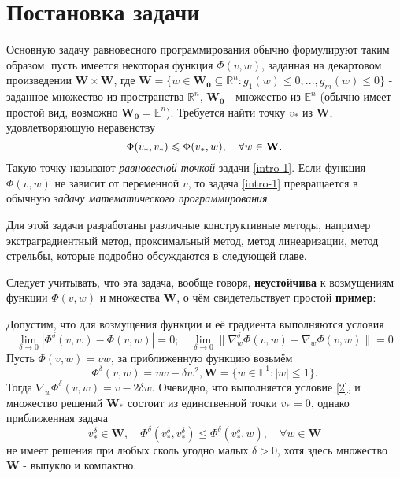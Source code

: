 {}
\section*{Постановка задачи}
	Основную задачу равновесного программирования обычно формулируют таким образом: пусть имеется некоторая функция $\Phi(v,w)$, заданная на декартовом произведении $\mathbf{W}\times \mathbf{W}$, где $\mathbf{W}=\{w\in \mathbf{W_0}\subseteq\mathbb{R}^n:g_1(w)\leqslant 0,...,g_m(w)\leqslant 0 \}$ - заданное множество из пространства $\mathbb{R}^n$, $\mathbf{W_0}$ - множество из $\mathbb{E}^n$ (обычно имеет простой вид, возможно $\mathbf{W_{0}}=\mathbb{E}^n$). Требуется найти точку $v_*$ из $\mathbf{W}$, удовлетворяющую неравенству 
	\begin{equation}
	\centering
	\label{intro-1}
	\Phi(v_*,v_*)\leqslant\Phi(v_*,w),\quad \forall w\in \mathbf{W}.
	\end{equation}
	Такую точку называют \emph{равновесной точкой} задачи \eqref{intro-1}. Если функция $\Phi(v,w)$ не зависит от переменной $v$, то задача \eqref{intro-1} превращается в обычную \textit{задачу математического программирования}.
	
	Для этой задачи разработаны различные конструктивные методы, например экстраградиентный метод, проксимальный метод, метод линеаризации, метод стрельбы, которые подробно обсуждаются в следующей главе.  
	
	Следует учитывать, что эта задача, вообще говоря, \textbf{неустойчива} к возмущениям функции $\Phi(v,w)$ и множества $\mathbf{W}$, о чём свидетельствует простой \textbf{пример}:
	
	Допустим, что для возмущения функции и её градиента выполняются условия
	\begin{equation}
	\label{2}
	\lim\limits_{\delta\to 0} |\Phi^{\delta}(v,w)-\Phi(v,w)|=0;\quad  \lim\limits_{\delta\to 0} \|\nabla_w^{\delta}\Phi(v,w)-\nabla_w\Phi(v,w)\|=0
	\end{equation}
	Пусть $\Phi(v,w)=vw$, за приближенную функцию возьмём
	\begin{equation*}
	\Phi^{\delta}(v,w)=vw-\delta w^2,\mathbf{W}=\{w\in \mathbb{E}^1:|w|\leqslant 1 \}.
	\end{equation*}
	 Тогда $\nabla_w \Phi^{\delta}(v,w)=v-2\delta w$. Очевидно, что выполняется условие \eqref{2}, и множество решений $\mathbf{W_*}$ состоит из единственной точки $v_*=0$, однако приближенная задача
	\begin{equation}
	v_*^{\delta}\in \mathbf{W},\quad\Phi^{\delta}(v_*^{\delta},v_*^{\delta})\leqslant \Phi^{\delta}(v_*^{\delta},w),\quad \forall w\in \mathbf{W}
	\end{equation}
	не имеет решения при любых сколь угодно малых $\delta >0$, хотя здесь множество $\mathbf{W}$ - выпукло и компактно.
	
